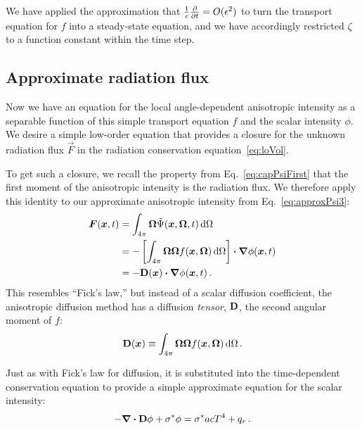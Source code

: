 We have applied the approximation that $\frac{1}{c}\frac{\partial }{\partial t}= O(\epsilon^2)$
to turn the transport equation for $f$ into a steady-state equation, and we have
accordingly restricted $\zeta$ to a function constant within the time step.

\subsection{Approximate radiation flux}
Now we have an equation for the local angle-dependent anisotropic intensity as a
separable
function of this simple transport equation $f$ and the scalar intensity $\phi$.
We desire a simple low-order equation that provides a closure for the unknown
radiation flux $\vec{F}$ in the radiation conservation
equation~\eqref{eq:loVol}.

To get such a closure, we recall the property from Eq.~\eqref{eq:capPsiFirst}
that the first moment of the anisotropic intensity is the radiation flux. We
therefore apply this identity to our approximate anisotropic intensity from
Eq.~\eqref{eq:approxPsi3}:
\begin{align} \nonumber
  \bm{F}(\bm{x}, t)
  &= \int_{4\pi} \bm{\Omega} \tilde \Psi(\bm{x}, \bm{\Omega}, t) \mathop{}\!\mathrm{d}\Omega
  \\ \nonumber
  &= 
  - \left[ \int_{4\pi} \bm{\Omega} \bm{\Omega} f(\bm{x}, \bm{\Omega})
  \mathop{}\!\mathrm{d}\Omega \right]
  \bm{\cdot} \bm{\nabla} \phi(\bm{x},t)
  \\ \label{eq:anisotropicFicks}
  &= - \mathbf{D}(\bm{x}) \bm{\cdot} \bm{\nabla} \phi(\bm{x},t) \,.
\end{align}
This resembles ``Fick's law,'' but instead of a scalar diffusion coefficient,
the anisotropic diffusion method has a diffusion \emph{tensor}, $\mathbf{D}$, the
second angular moment of $f$:
\begin{equation}\label{eq:dDefinition}
  \mathbf{D}(\bm{x}) \equiv \int_{4\pi} \bm{\Omega} \bm{\Omega}
  f(\bm{x}, \bm{\Omega}) \mathop{}\!\mathrm{d}\Omega \,.
\end{equation}

Just as with Fick's law for diffusion, it is
substituted into the time-dependent conservation equation to provide a simple
approximate equation for the scalar intensity:
\begin{equation*}
  -\bm{\nabla} \bm{\cdot} \mathbf{D} \phi + \sigma^\ast \phi = \sigma^\ast ac T^4 + q_{r} \,.
\end{equation*}

